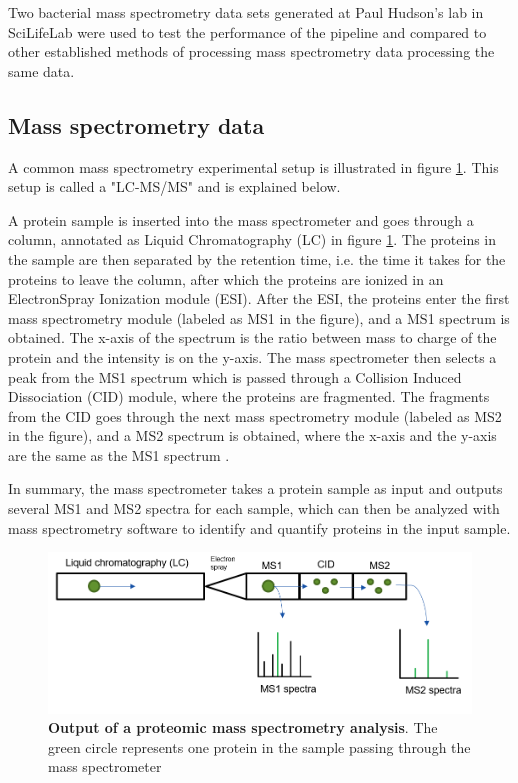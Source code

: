 Two bacterial mass spectrometry data sets generated at Paul Hudson's lab in SciLifeLab were used to test the performance of the pipeline and compared to other established methods of processing mass spectrometry data processing the same data.

\subsection{Mass spectrometry data}

A common mass spectrometry experimental setup is illustrated in figure \ref{fig:mass-spec}. This setup is called a "LC-MS/MS" and is explained below.

A protein sample is inserted into the mass spectrometer and goes through a column, annotated as Liquid Chromatography (LC) in figure \ref{fig:mass-spec}. The proteins in the sample are then separated by the retention time, i.e. the time it takes for the proteins to leave the column, after which the proteins are ionized in an ElectronSpray Ionization module (ESI). After the ESI, the proteins enter the first mass spectrometry module (labeled as MS1 in the figure), and a MS1 spectrum is obtained. The x-axis of the spectrum is the ratio between mass to charge of the protein and the intensity is on the y-axis. The mass spectrometer then selects a peak from the MS1 spectrum which is passed through a Collision Induced Dissociation (CID) module, where the proteins are fragmented. The fragments from the CID goes through the next mass spectrometry module (labeled as MS2 in the figure), and a MS2 spectrum is obtained, where the x-axis and the y-axis are the same as the MS1 spectrum \cite{quantitative_analysis}.

In summary, the mass spectrometer takes a protein sample as input and outputs several MS1 and MS2 spectra for each sample, which can then be analyzed with mass spectrometry software to identify and quantify proteins in the input sample.

\begin{figure}[H]
  \includegraphics[width=\linewidth]{pictures/mass_spec.png}
  \caption{\textbf{Output of a proteomic mass spectrometry analysis}. The green circle represents one protein in the sample passing through the mass spectrometer}
  \label{fig:mass-spec}
\end{figure}

